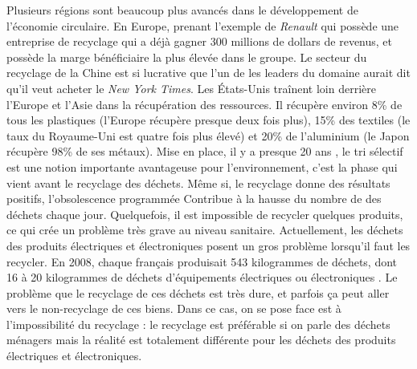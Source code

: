 \smallbreak
Plusieurs régions sont beaucoup plus avancés dans le développement de l'économie circulaire. En Europe, prenant l'exemple de \textit{Renault} qui possède une entreprise de recyclage qui a déjà gagner 300 millions de dollars de revenus, et possède la marge bénéficiaire la plus élevée dans le groupe. Le secteur du recyclage de la Chine est si lucrative que l'un de les leaders du domaine aurait dit qu'il veut acheter le \textit{New York Times}. 
Les États-Unis traînent loin derrière l'Europe et l'Asie dans la récupération des ressources. Il récupère environ 8\% de tous les plastiques (l'Europe récupère presque deux fois plus), 15\% des textiles (le taux du Royaume-Uni est quatre fois plus élevé) et 20\% de l'aluminium (le Japon récupère 98\% de ses métaux).
Mise en place, il y a presque 20 ans , le tri sélectif est une notion importante avantageuse pour l’environnement, c'est la phase qui vient avant le recyclage des déchets. Même si, le recyclage donne des résultats positifs, l’obsolescence programmée Contribue à la hausse du nombre de des déchets chaque jour. Quelquefois, il est impossible de recycler quelques produits, ce qui crée un problème très grave au niveau sanitaire. 
Actuellement, les déchets des produits électriques et électroniques posent un gros problème lorsqu'il faut les recycler. En 2008, chaque français produisait 543 kilogrammes de déchets, dont 16 à 20 kilogrammes de déchets d’équipements électriques ou électroniques . Le problème que le recyclage de ces déchets est très dure, et parfois ça peut aller vers le non-recyclage de ces biens. Dans ce cas, on se pose face est à l'impossibilité du recyclage : le recyclage est préférable si on parle des déchets ménagers mais la réalité est totalement différente pour les déchets des produits électriques et électroniques. 
